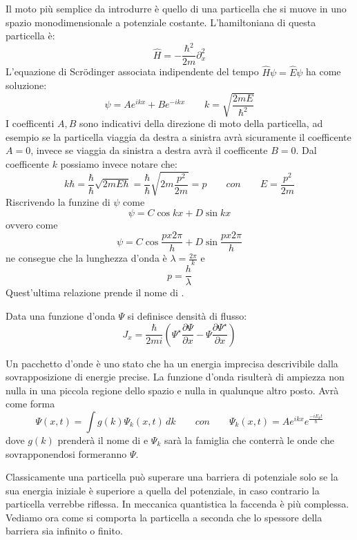 Il moto più semplice da introdurre è quello di una particella che si muove in uno spazio monodimensionale a potenziale costante. L'hamiltoniana di questa particella è:
$$\hat{H} = - \frac{\hbar^2}{2m} \partial_x^2$$
L'equazione di Scr\"odinger associata indipendente del tempo $\hat{H}\psi = \hat{E}\psi$ ha come soluzione:
$$\psi = A e^{i k x} + B e^{- i k x} \qquad k = \sqrt{\frac{2 m E}{\hbar^2}}$$
I coefficenti $A, B$ sono indicativi della direzione di moto della particella, ad esempio se la particella viaggia da destra a sinistra avrà sicuramente il coefficente $A = 0$, invece se viaggia da sinistra a destra avrà il coefficente $B = 0$.
Dal coefficente $k$ possiamo invece notare che:
$$k\hbar = \frac{\hbar}{\hbar} \sqrt{2 m E \hbar} = \frac{\hbar}{\hbar} \sqrt{2 m \frac{p^2}{2 m}} = p \qquad con \qquad E = \frac{p^2}{2m}$$
Riscrivendo la funzine di $\psi$ come
$$\psi = C \cos{kx} + D \sin{kx}$$
ovvero come
$$\psi = C \cos{\frac{p x 2 \pi}{h}} + D \sin{\frac{p x 2 \pi}{h}}$$
ne consegue che la lunghezza d'onda è $\lambda = \frac{2\pi}{k}$ e
$$p = \frac{h}{\lambda}$$
Quest'ultima relazione prende il nome di .

Data una funzione d'onda $\Psi$ si definisce densità di flusso:
$$J_x = \frac{\hbar}{2mi}\left(\Psi^{\star} \frac{\partial \Psi}{\partial x} - \Psi \frac{\partial \Psi^{\star}}{\partial x}  \right)$$

Un pacchetto d'onde è uno stato che ha un energia imprecisa descrivibile dalla sovrapposizione di energie precise.
La funzione d'onda risulterà di ampiezza non nulla in una piccola regione dello spazio e nulla in qualunque altro posto.
Avrà come forma
$$\Psi(x, t) = \int g(k) \Psi_k(x, t) \, dk \qquad con \qquad \Psi_k(x, t) = A e^{ikx} e^{\frac{-i E_k t}{\hbar}}$$
dove $g(k)$ prenderà il nome di  e $\Psi_k$ sarà la famiglia che conterrà le onde che sovrapponendosi formeranno $\Psi$.

Classicamente una particella può superare una barriera di potenziale solo se la sua energia iniziale è superiore a quella del potenziale, in caso contrario la particella verrebbe riflessa. In meccanica quantistica la faccenda è più complessa. Vediamo ora come si comporta la particella a seconda che lo spessore della barriera sia infinito o finito.

